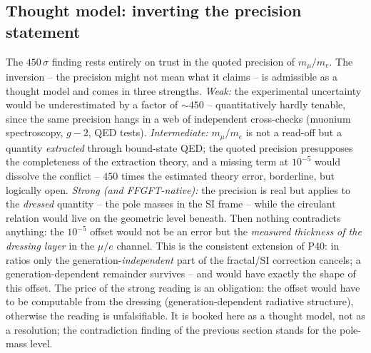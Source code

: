 \subsection{Thought model: inverting the precision statement}
The $450\,\sigma$ finding rests entirely on trust in the quoted precision
of $m_\mu/m_e$. The inversion -- the precision might not mean what it
claims -- is admissible as a thought model and comes in three strengths.
\emph{Weak:} the experimental uncertainty would be underestimated by a
factor of $\sim450$ -- quantitatively hardly tenable, since the same
precision hangs in a web of independent cross-checks (muonium spectroscopy,
$g\!-\!2$, QED tests). \emph{Intermediate:} $m_\mu/m_e$ is not a
read-off but a quantity \emph{extracted} through bound-state QED; the
quoted precision presupposes the completeness of the extraction theory, and
a missing term at $10^{-5}$ would dissolve the conflict -- $450$ times the
estimated theory error, borderline, but logically open. \emph{Strong (and
FFGFT-native):} the precision is real but applies to the \emph{dressed}
quantity -- the pole masses in the SI frame -- while the circulant relation
would live on the geometric level beneath. Then nothing contradicts
anything: the $10^{-5}$ offset would not be an error but the
\emph{measured thickness of the dressing layer} in the $\mu/e$ channel.
This is the consistent extension of P40: in ratios only the
generation-\emph{independent} part of the fractal/SI correction cancels; a
generation-dependent remainder survives -- and would have exactly the shape
of this offset. The price of the strong reading is an obligation: the
offset would have to be computable from the dressing
(generation-dependent radiative structure), otherwise the reading is
unfalsifiable. It is booked here as a thought model, not as a resolution;
the contradiction finding of the previous section stands for the pole-mass
level.


